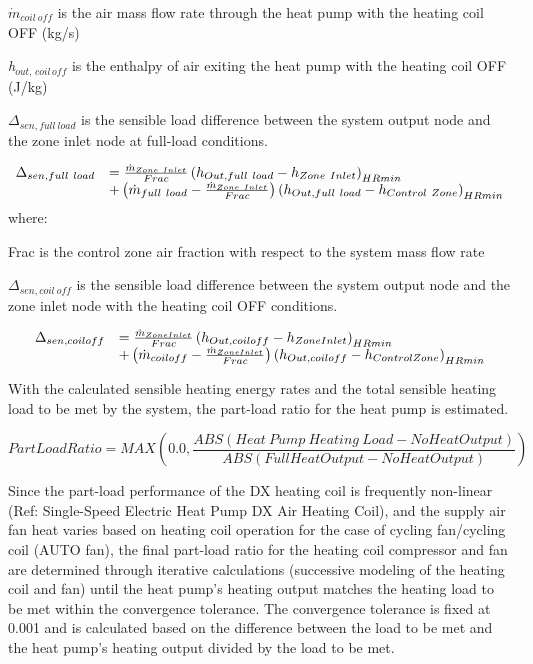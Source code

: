 \({\dot{m}_{coil~off}}\) is the air mass flow rate through the heat pump with the heating coil OFF (kg/s)

\emph{h\(_{out,\, coil \, off}\)} is the enthalpy of air exiting the heat pump with the heating coil OFF (J/kg)

\(\Delta_{sen,full~load}\) is the sensible load difference between the system output node and the zone inlet node at full-load conditions.

\begin{equation}
  \begin{array}{rl}
    \Delta_{sen,full~load} &= \frac{\dot{m}_{Zone~Inlet}}{Frac} \left(h_{Out,full~load} - h_{Zone~Inlet}\right)_{HRmin} \\
                           &+ \left(\dot{m}_{full~load} - \frac{\dot{m}_{Zone~Inlet}}{Frac}\right) \left(h_{Out,full~load} - h_{Control~Zone}\right)_{HRmin}
  \end{array}
\end{equation}
where:

Frac is the control zone air fraction with respect to the system mass flow rate

\(\Delta_{sen,coil~off}\) is the sensible load difference between the system output node and the zone inlet node with the heating coil OFF conditions.

\begin{equation}
  \begin{array}{rl}
    \Delta_{sen,coil off} &= \frac{\dot{m}_{ZoneInlet}}{Frac} \left(h_{Out,coil off} - h_{ZoneInlet}\right)_{HRmin} \\
                           &+ \left(\dot{m}_{coil off} - \frac{\dot{m}_{ZoneInlet}}{Frac}\right) \left(h_{Out,coil off} - h_{ControlZone}\right)_{HRmin}
  \end{array}
\end{equation}

With the calculated sensible heating energy rates and the total sensible heating load to be met by the system, the part-load ratio for the heat pump is estimated.

\begin{equation}
PartLoadRatio = MAX\left( {0.0,\frac{{ABS\left( {Heat~Pump~Heating~Load - NoHeatOutput} \right)}}{{ABS\left( {FullHeatOutput - NoHeatOutput} \right)}}} \right)
\label{eq:UnitarySystemPartLoadRatioHeating590}
\end{equation}

Since the part-load performance of the DX heating coil is frequently non-linear (Ref: Single-Speed Electric Heat Pump DX Air Heating Coil), and the supply air fan heat varies based on heating coil operation for the case of cycling fan/cycling coil (AUTO fan), the final part-load ratio for the heating coil compressor and fan are determined through iterative calculations (successive modeling of the heating coil and fan) until the heat pump's heating output matches the heating load to be met within the convergence tolerance. The convergence tolerance is fixed at 0.001 and is calculated based on the difference between the load to be met and the heat pump's heating output divided by the load to be met.


